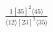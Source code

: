 \documentclass[varwidth, border=5pt]{standalone}
\begin{document}
\begin{my}
$\begin{gathered}
\scriptscriptstyle\frac{1[35]^2⟨45⟩}{⟨12⟩[23]^2⟨35⟩}
\end{gathered}$
\end{my}
\end{document}
